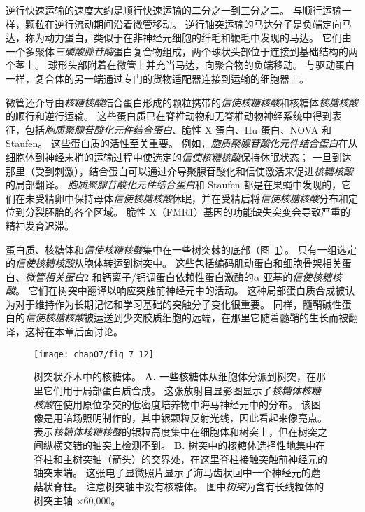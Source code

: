逆行快速运输的速度大约是顺行快速运输的二分之一到三分之二。
与顺行运输一样，颗粒在逆行流动期间沿着微管移动。
逆行轴突运输的马达分子是负端定向马达，称为动力蛋白，类似于在非神经元细胞的纤毛和鞭毛中发现的马达。 它们由一个多聚体\textit{三磷酸腺苷酶}蛋白复合物组成，两个球状头部位于连接到基础结构的两个茎上。
球形头部附着在微管上并充当马达，向聚合物的负端移动。
与驱动蛋白一样，复合体的另一端通过专门的货物适配器连接到运输的细胞器上。


微管还介导由\textit{核糖核酸}结合蛋白形成的颗粒携带的\textit{信使核糖核酸}和核糖体\textit{核糖核酸}的顺行和逆行运输。
这些蛋白质已在脊椎动物和无脊椎动物神经系统中得到表征，包括\textit{胞质聚腺苷酸化元件结合蛋白}、脆性 X 蛋白、Hu 蛋白、NOVA 和 Staufen。
这些蛋白质的活性至关重要。
例如，\textit{胞质聚腺苷酸化元件结合蛋白}在从细胞体到神经末梢的运输过程中使选定的\textit{信使核糖核酸}保持休眠状态；
一旦到达那里（受到刺激），结合蛋白可以通过介导聚腺苷酸化和信使激活来促进\textit{核糖核酸}的局部翻译。
\textit{胞质聚腺苷酸化元件结合蛋白}和 Staufen 都是在果蝇中发现的，它们在未受精卵中保持母体\textit{信使核糖核酸}休眠，并在受精后将\textit{信使核糖核酸}分布和定位到分裂胚胎的各个区域。
脆性 X（FMR1）基因的功能缺失突变会导致严重的精神发育迟滞。


蛋白质、核糖体和\textit{信使核糖核酸}集中在一些树突棘的底部（图~\ref{fig:7_12}）。
只有一组选定的\textit{信使核糖核酸}从胞体转运到树突中。
这些包括编码肌动蛋白和细胞骨架相关蛋白、\textit{微管相关蛋白}2 和钙离子/钙调蛋白依赖性蛋白激酶的$\alpha$ 亚基的\textit{信使核糖核酸}。
它们在树突中翻译以响应突触前神经元中的活动。
这种局部蛋白质合成被认为对于维持作为长期记忆和学习基础的突触分子变化很重要。
同样，髓鞘碱性蛋白的\textit{信使核糖核酸}被运送到少突胶质细胞的远端，在那里它随着髓鞘的生长而被翻译，这将在本章后面讨论。


\begin{figure}[htbp]
	\centering
	\texttt{[image: chap07/fig\_7\_12]}
	\caption{树突状乔木中的核糖体。
		\textbf{A.} 一些核糖体从细胞体分派到树突，在那里它们用于局部蛋白质合成。
		这张放射自显影图显示了\textit{核糖体核糖核酸}在使用原位杂交的低密度培养物中海马神经元中的分布。
		该图像是用暗场照明制作的，其中银颗粒反射光线，因此看起来像亮点。
		表示\textit{核糖体核糖核酸}的银粒高度集中在细胞体和树突上，但在树突之间纵横交错的轴突上检测不到。
		\textbf{B.} 树突中的核糖体选择性地集中在脊柱和主树突轴（箭头）的交界处，在这里脊柱接触突触前神经元的轴突末端。
		这张电子显微照片显示了海马齿状回中一个神经元的蘑菇状脊柱。
		注意树突轴中没有核糖体。
		图中\textit{树突}为含有长线粒体的树突主轴 ×60,000。}
	\label{fig:7_12}
\end{figure}


